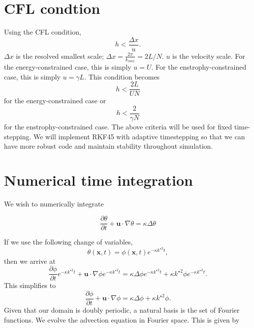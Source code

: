 \documentclass[12pt]{article}
\begin{document}
\section{CFL condtion}

Using the CFL condition,
\begin{equation}
h < \frac{ \Delta x}{u} .
\end{equation}
$\Delta x$ is the resolved smallest scale; $\Delta x=\frac{2\pi}{k_{max}} = 2L/N$. $u$ is the velocity scale. For the energy-constrained case, this is simply $u=U$. For the enstrophy-constrained case, this is simply $u=\gamma L$. This condition becomes
\begin{equation}
h < \frac{2L }{U N} 
\end{equation}
for the energy-constrained case or
\begin{equation}
h < \frac{2}{\gamma N} 
\end{equation}
for the enstrophy-constrained case. The above criteria will be used for fixed time-stepping. We will implement RKF45 with adaptive timestepping so that we can have more robust code and maintain stability throughout simulation.

\section{Numerical time integration}
We wish to numerically integrate

\begin{equation}
\frac{\partial \theta }{\partial t} + \mathbf{u}\cdot \nabla \theta = \kappa \Delta \theta
\end{equation}

If we use the following change of variables, 
\begin{equation}
\theta(\mathbf{x},t)=\phi (\mathbf{x},t)e^{-\kappa k^{\star 2}t},
\end{equation}
then we arrive at
\begin{equation}
\frac{\partial \phi }{\partial t} e^{-\kappa k^{\star 2}t}  + \mathbf{u}\cdot \nabla \phi e^{-\kappa k^{\star 2}t}= \kappa \Delta \phi e^{-\kappa k^{\star 2}t} + \kappa k^{\star 2} \phi  e^{-\kappa k^{\star 2}t}.
\end{equation}
This simplifies to 
\begin{equation}
\frac{\partial \phi }{\partial t}   + \mathbf{u}\cdot \nabla \phi = \kappa \Delta \phi  + \kappa k^{\star 2} \phi  .
\end{equation}
Given that our domain is doubly periodic, a natural basis is the set of Fourier functions. We evolve the advection equation in Fourier space. This is given by
\end{document}
